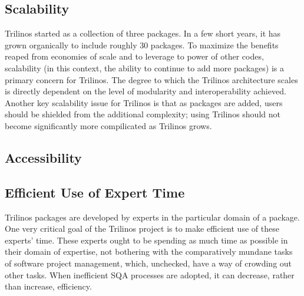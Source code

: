 \documentclass[12pt,relax]{article}
\begin{document}
\subsection{Scalability}
Trilinos started as a collection of three packages.  In a few short years, it
has grown organically to include roughly 30 packages.  To maximize the
benefits reaped from economies of scale and to leverage to power of other
codes, scalability (in this context, the ability to continue to add more
packages) is a primary concern for Trilinos.  The degree to which the Trilinos
architecture scales is directly dependent on the level of modularity and
interoperability achieved.  Another key scalability issue for Trilinos is that
as packages are added, users should be shielded from the additional complexity;
using Trilinos should not become significantly more compilicated as Trilinos
grows.


\subsection{Accessibility}



\subsection{Efficient Use of Expert Time}
Trilinos packages are developed by experts in the particular domain of a
package.  One very critical goal of the Trilinos project is to make efficient
use of these experts' time.  These experts ought to be spending as much time as
possible in their domain of expertise, not bothering with the comparatively
mundane tasks of software project management, which, unchecked, have a way of
crowding out other tasks.  When inefficient SQA processes are adopted, it can 
decrease, rather than increase, efficiency.
\end{document}
